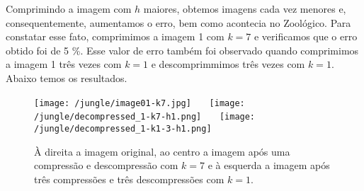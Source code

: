 \documentclass{article}
\begin{document}
		Comprimindo a imagem com $h$ maiores, obtemos imagens cada vez menores e, consequentemente, aumentamos o erro, bem como acontecia no Zoológico. Para constatar esse fato, comprimimos a imagem 1 com $k = 7$ e verificamos que o erro obtido foi de 5 \%. Esse valor de erro também foi observado quando comprimimos a imagem 1 três vezes com $k = 1$ e descomprimmimos três vezes com $k = 1$. Abaixo temos os resultados.
		\begin{figure}[H]
			\centering
			\captionsetup{justification=centering}
			\texttt{[image: /jungle/image01-k7.jpg]} \ \ \
			\texttt{[image: /jungle/decompressed\_1-k7-h1.png]} \ \ \
			\texttt{[image: /jungle/decompressed\_1-k1-3-h1.png]} \\
			\caption{À direita a imagem original, ao centro a imagem após uma compressão e descompressão com $k = 7$ e à esquerda a imagem após três compressões e três descompressões com $k = 1$.}  
		\end{figure}\par
	\pagebreak
\end{document}
